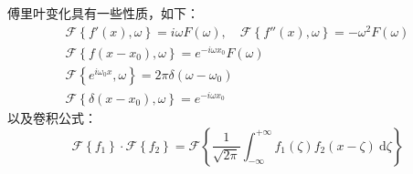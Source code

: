 \documentclass[UTF8]{report}
\theoremstyle{MyLineTheoremStyle} %
\theoremstyle{MyBlockTheoremStyle} %
\theoremstyle{MySubsubsectionStyle} %
\begin{document}
傅里叶变化具有一些性质，如下：
\begin{gather}
\mathscr{F} \left\{ f'(x), \omega \right\} = i\omega F(\omega),\quad 
\mathscr{F} \left\{ f''(x), \omega \right\} = -\omega^2 F(\omega) \\
\mathscr{F} \left\{ f(x - x_0), \omega \right\} = e^{-i\omega x_0} F(\omega) \\
\mathscr{F} \left\{ e^{i\omega_0 x}, \omega \right\} = 2\pi \delta(\omega - \omega_0) \\
\mathscr{F} \left\{ \delta(x - x_0), \omega \right\} = e^{-i\omega x_0}
\end{gather}
以及卷积公式：
\begin{equation}
\mathscr{F}\left\{ f_1\right\}\cdot \mathscr{F}\left\{ f_2\right\} = \mathscr{F}\left\{ \frac{1}{\sqrt{2\pi} }\int_{-\infty}^{+\infty} f_1(\zeta) f_2(x - \zeta) \ \mathrm{d}\zeta  \right\}
\end{equation}
\end{document}
